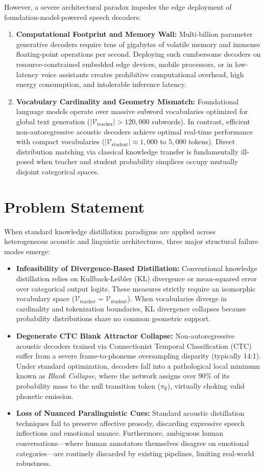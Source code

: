 However, a severe architectural paradox impedes the edge deployment of foundation-model-powered speech decoders:
\begin{enumerate}
    \item \textbf{Computational Footprint and Memory Wall:} Multi-billion parameter generative decoders require tens of gigabytes of volatile memory and immense floating-point operations per second. Deploying such cumbersome decoders on resource-constrained embedded edge devices, mobile processors, or in low-latency voice assistants creates prohibitive computational overhead, high energy consumption, and intolerable inference latency.
    \item \textbf{Vocabulary Cardinality and Geometry Mismatch:} Foundational language models operate over massive subword vocabularies optimized for global text generation ($|\mathcal{V}_{\text{teacher}}| > 120{,}000$ subwords). In contrast, efficient non-autoregressive acoustic decoders achieve optimal real-time performance with compact vocabularies ($|\mathcal{V}_{\text{student}}| \approx 1{,}000$ to $5{,}000$ tokens). Direct distribution matching via classical knowledge transfer is fundamentally ill-posed when teacher and student probability simplices occupy mutually disjoint categorical spaces.
\end{enumerate}

\section{Problem Statement}
When standard knowledge distillation paradigms are applied across heterogeneous acoustic and linguistic architectures, three major structural failure modes emerge:
\begin{itemize}
    \item \textbf{Infeasibility of Divergence-Based Distillation:} Conventional knowledge distillation relies on Kullback-Leibler (KL) divergence or mean-squared error over categorical output logits. These measures strictly require an isomorphic vocabulary space ($\mathcal{V}_{\text{teacher}} = \mathcal{V}_{\text{student}}$). When vocabularies diverge in cardinality and tokenization boundaries, KL divergence collapses because probability distributions share no common geometric support.
    \item \textbf{Degenerate CTC Blank Attractor Collapse:} Non-autoregressive acoustic decoders trained via Connectionist Temporal Classification (CTC) suffer from a severe frame-to-phoneme oversampling disparity (typically 14:1). Under standard optimization, decoders fall into a pathological local minimum known as \textit{Blank Collapse}, where the network assigns over 90\% of its probability mass to the null transition token ($\pi_\emptyset$), virtually choking valid phonetic emission.
    \item \textbf{Loss of Nuanced Paralinguistic Cues:} Standard acoustic distillation techniques fail to preserve affective prosody, discarding expressive speech inflections and emotional nuance. Furthermore, ambiguous human conversations—where human annotators themselves disagree on emotional categories—are routinely discarded by existing pipelines, limiting real-world robustness.
\end{itemize}

